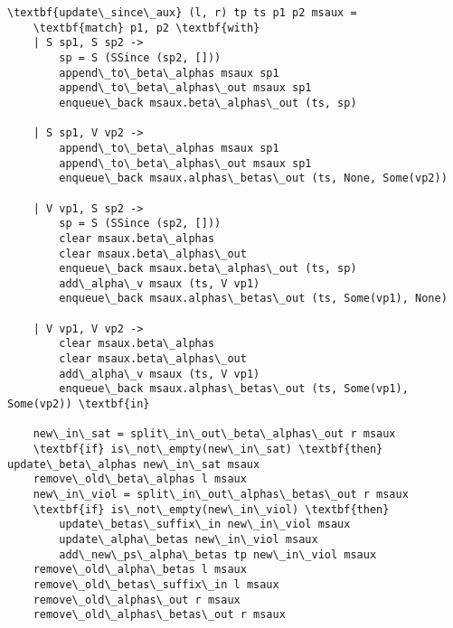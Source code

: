 \documentclass[12pt]{article}
\begin{document}
\begin{Verbatim}[fontfamily=helvetica,fontsize=\small,commandchars=\\\{\},codes={\catcode`$=3\catcode`_=8}]
\textbf{update\_since\_aux} (l, r) tp ts p1 p2 msaux =
    \textbf{match} p1, p2 \textbf{with}
    | S sp1, S sp2 ->
        sp = S (SSince (sp2, []))
        append\_to\_beta\_alphas msaux sp1
        append\_to\_beta\_alphas\_out msaux sp1
        enqueue\_back msaux.beta\_alphas\_out (ts, sp)
                                        
    | S sp1, V vp2 ->
        append\_to\_beta\_alphas msaux sp1
        append\_to\_beta\_alphas\_out msaux sp1
        enqueue\_back msaux.alphas\_betas\_out (ts, None, Some(vp2))
                                        
    | V vp1, S sp2 ->
        sp = S (SSince (sp2, []))
        clear msaux.beta\_alphas
        clear msaux.beta\_alphas\_out
        enqueue\_back msaux.beta\_alphas\_out (ts, sp)
        add\_alpha\_v msaux (ts, V vp1)
        enqueue\_back msaux.alphas\_betas\_out (ts, Some(vp1), None)

    | V vp1, V vp2 ->
        clear msaux.beta\_alphas 
        clear msaux.beta\_alphas\_out
        add\_alpha\_v msaux (ts, V vp1)
        enqueue\_back msaux.alphas\_betas\_out (ts, Some(vp1), Some(vp2)) \textbf{in}

    new\_in\_sat = split\_in\_out\_beta\_alphas\_out r msaux
    \textbf{if} is\_not\_empty(new\_in\_sat) \textbf{then} update\_beta\_alphas new\_in\_sat msaux
    remove\_old\_beta\_alphas l msaux
    new\_in\_viol = split\_in\_out\_alphas\_betas\_out r msaux
    \textbf{if} is\_not\_empty(new\_in\_viol) \textbf{then}
        update\_betas\_suffix\_in new\_in\_viol msaux
        update\_alpha\_betas new\_in\_viol msaux
        add\_new\_ps\_alpha\_betas tp new\_in\_viol msaux
    remove\_old\_alpha\_betas l msaux
    remove\_old\_betas\_suffix\_in l msaux
    remove\_old\_alphas\_out r msaux
    remove\_old\_alphas\_betas\_out r msaux
\end{Verbatim}

\thispagestyle{empty}
\end{document}
